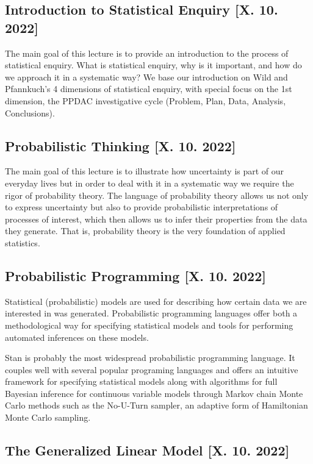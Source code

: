 \documentclass[fleqn,moreauthors,10pt]{ds_report}
\begin{document}
\subsection*{Introduction to Statistical Enquiry [X. 10. 2022]}

The main goal of this lecture is to provide an introduction to the process of statistical enquiry. What is statistical enquiry, why is it important, and how do we approach it in a systematic way? We base our introduction on Wild and Pfannkuch’s 4 dimensions of statistical enquiry, with special focus on the 1st dimension, the PPDAC investigative cycle (Problem, Plan, Data, Analysis, Conclusions).

\subsection*{Probabilistic Thinking [X. 10. 2022]}

The main goal of this lecture is to illustrate how uncertainty is part of our everyday lives but in order to deal with it in a systematic way we require the rigor of probability theory. The language of probability theory allows us not only to express uncertainty but also to provide probabilistic interpretations of processes of interest, which then allows us to infer their properties from the data they generate. That is, probability theory is the very foundation of applied statistics.

\subsection*{Probabilistic Programming [X. 10. 2022]}

Statistical (probabilistic) models are used for describing how certain data we are interested in was generated. Probabilistic programming languages offer both a methodological way for specifying statistical models and tools for performing automated inferences on these models.

Stan is probably the most widespread probabilistic programming language. It couples well with several popular programing languages and offers an intuitive framework for specifying statistical models along with algorithms for full Bayesian inference for continuous variable models through Markov chain Monte Carlo methods such as the No-U-Turn sampler, an adaptive form of Hamiltonian Monte Carlo sampling.

\subsection*{The Generalized Linear Model [X. 10. 2022]}
\end{document}
